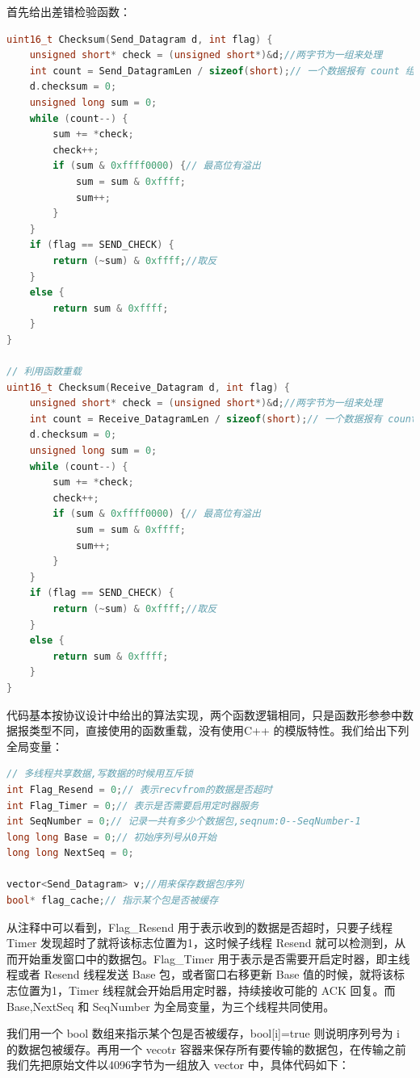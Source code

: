 \documentclass[UTF8,a4paper,10pt]{ctexart}
\begin{document}
首先给出差错检验函数：
\begin{lstlisting}[frame=trbl,language={C++}]
uint16_t Checksum(Send_Datagram d, int flag) {
    unsigned short* check = (unsigned short*)&d;//两字节为一组来处理
    int count = Send_DatagramLen / sizeof(short);// 一个数据报有 count 组
    d.checksum = 0;
    unsigned long sum = 0;
    while (count--) {
        sum += *check;
        check++;
        if (sum & 0xffff0000) {// 最高位有溢出
            sum = sum & 0xffff;
            sum++;
        }
    }
    if (flag == SEND_CHECK) {
        return (~sum) & 0xffff;//取反
    }
    else {
        return sum & 0xffff;
    }
}

// 利用函数重载
uint16_t Checksum(Receive_Datagram d, int flag) {
    unsigned short* check = (unsigned short*)&d;//两字节为一组来处理
    int count = Receive_DatagramLen / sizeof(short);// 一个数据报有 count 组
    d.checksum = 0;
    unsigned long sum = 0;
    while (count--) {
        sum += *check;
        check++;
        if (sum & 0xffff0000) {// 最高位有溢出
            sum = sum & 0xffff;
            sum++;
        }
    }
    if (flag == SEND_CHECK) {
        return (~sum) & 0xffff;//取反
    }
    else {
        return sum & 0xffff;
    }
}
\end{lstlisting}
代码基本按协议设计中给出的算法实现，两个函数逻辑相同，只是函数形参参中数据报类型不同，直接使用的函数重载，没有使用C++ 的模版特性。我们给出下列全局变量：
\begin{lstlisting}[frame=trbl,language={C++}]
// 多线程共享数据,写数据的时候用互斥锁
int Flag_Resend = 0;// 表示recvfrom的数据是否超时
int Flag_Timer = 0;// 表示是否需要启用定时器服务
int SeqNumber = 0;// 记录一共有多少个数据包,seqnum:0--SeqNumber-1
long long Base = 0;// 初始序列号从0开始
long long NextSeq = 0;

vector<Send_Datagram> v;//用来保存数据包序列
bool* flag_cache;// 指示某个包是否被缓存
\end{lstlisting}\par
从注释中可以看到，Flag\_Resend 用于表示收到的数据是否超时，只要子线程 Timer 发现超时了就将该标志位置为1，这时候子线程 Resend 就可以检测到，从而开始重发窗口中的数据包。Flag\_Timer 用于表示是否需要开启定时器，即主线程或者 
 Resend 线程发送 Base 包，或者窗口右移更新 Base 值的时候，就将该标志位置为1，Timer 线程就会开始启用定时器，持续接收可能的 ACK 回复。而 Base,NextSeq 和 SeqNumber 为全局变量，为三个线程共同使用。\par
我们用一个 bool 数组来指示某个包是否被缓存，bool[i]=true 则说明序列号为 i 的数据包被缓存。再用一个 vecotr 容器来保存所有要传输的数据包，在传输之前我们先把原始文件以4096字节为一组放入 vector 中，具体代码如下：
\end{document}

